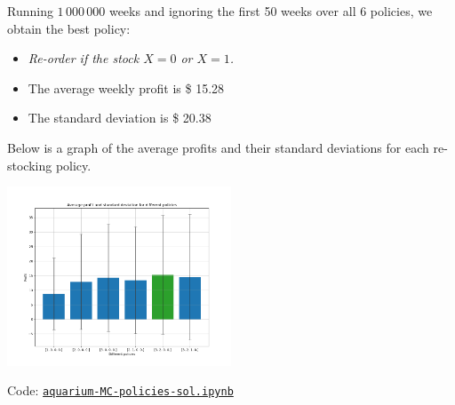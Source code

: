 \begin{solution}
\begin{slide}
\begin{parts}
\setcounter{partsitem}{4}
	\item Running $1\,000\,000$ weeks and ignoring the first 50 weeks over all 6 policies, we obtain the best policy: 
	\begin{itemize}
		\item \textit{Re-order if the stock $X=0$ or $X=1$.}
		\item The average weekly profit is \$ 15.28
		\item The standard deviation is \$ 20.38
	\end{itemize}
	Below is a graph of the average profits and their standard deviations for each re-stocking policy.
	
	\includegraphics[width=0.5\textwidth]{images/aquarium-policies.png}	

	Code: \href{https://utoronto.syzygy.ca/jupyter/user-redirect/git-pull?repo=https://github.com/bigfatbernie/IBLMathModeling&subPath=book/python/aquarium-MC-policies-sol.ipynb}{\tt aquarium-MC-policies-sol.ipynb}
	
	
\end{parts}


	
\end{slide}	
\end{solution}




\begin{slide}
\question


\end{slide}

